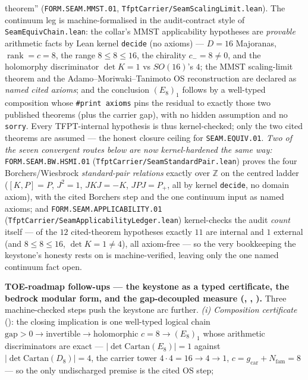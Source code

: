\documentclass[11pt,a4paper]{article}
\newcommand{\Nfam}{N_{\mathrm{fam}}}
\newcommand{\gcar}{g_{\mathrm{car}}}
\begin{document}
\begin{keybox}
{theorem'' (\texttt{FORM.SEAM.MMST.01}, \texttt{TfptCarrier/SeamScalingLimit.lean}).} The continuum leg is
machine-formalised in the audit-contract style of \texttt{SeamEquivChain.lean}: the collar's MMST
applicability hypotheses are \emph{provable} arithmetic facts by Lean kernel \texttt{decide} (no axioms) ---
$D{=}16$ Majoranas, $\operatorname{rank}{=}c{=}8$, the range $8\le8\le16$, the chirality $c_-{=}8\neq0$, and
the holomorphy discriminator $\det K{=}1$ vs $SO(16)$'s $4$; the MMST scaling-limit theorem and the
Adamo--Moriwaki--Tanimoto OS reconstruction are declared as \emph{named cited axioms}; and the conclusion
$(E_8)_1$ follows by a well-typed composition whose \texttt{\#print axioms} pins the residual to exactly those
two published theorems (plus the carrier gap), with no hidden assumption and no \texttt{sorry}. Every
TFPT-internal hypothesis is thus kernel-checked; only the two cited theorems are assumed --- the honest
closure ceiling for \texttt{SEAM.EQUIV.01}. \emph{Two of the seven convergent routes below are now
kernel-hardened the same way:} \texttt{FORM.SEAM.BW.HSMI.01} (\texttt{TfptCarrier/SeamStandardPair.lean})
proves the four Borchers/Wiesbrock \emph{standard-pair relations} exactly over $\mathbb{Z}$ on the centred
ladder ($[K,P]{=}P$, $J^2{=}1$, $JKJ{=}{-}K$, $JPJ{=}P_+$, all by kernel \texttt{decide}, no domain axiom),
with the cited Borchers step and the one continuum input as named axioms; and
\texttt{FORM.SEAM.APPLICABILITY.01} (\texttt{TfptCarrier/SeamApplicabilityLedger.lean}) kernel-checks the audit
\emph{count} itself --- of the $12$ cited-theorem hypotheses exactly $11$ are internal and $1$ external (and
$8\le8\le16$, $\det K{=}1\neq4$), all axiom-free --- so the very bookkeeping the keystone's honesty rests on is
machine-verified, leaving only the one named continuum fact open.
\par\smallskip\noindent\textbf{TOE-roadmap follow-ups --- the keystone as a typed certificate, the bedrock
modular form, and the gap-decoupled measure (, ,
).} Three machine-checked steps push the keystone arc further.
\emph{(i) Composition certificate} (): the closing implication is one well-typed
logical chain $\text{gap}{>}0\to\text{invertible}\to\text{holomorphic }c{=}8\to(E_8)_1$ whose arithmetic
discriminators are exact --- $|\det\mathrm{Cartan}(E_8)|{=}1$ against $|\det\mathrm{Cartan}(D_8)|{=}4$, the carrier
tower $4{\cdot}4{=}16\to4\to1$, $c{=}\gcar{+}\Nfam{=}8$ --- so the only undischarged premise is the cited OS step;

\end{keybox}
\end{document}
